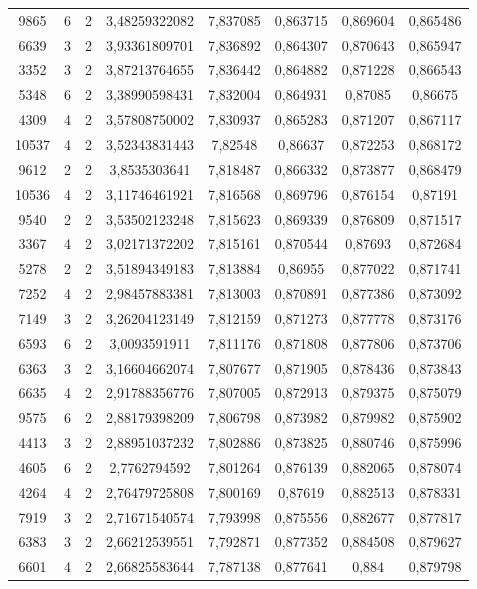 \begin{longtable}{|c|c|c|c|c|c|c|c|}
9865 & 6 & 2 & 3,48259322082 & 7,837085 & 0,863715 & 0,869604 & 0,865486 \\
6639 & 3 & 2 & 3,93361809701 & 7,836892 & 0,864307 & 0,870643 & 0,865947 \\
3352 & 3 & 2 & 3,87213764655 & 7,836442 & 0,864882 & 0,871228 & 0,866543 \\
5348 & 6 & 2 & 3,38990598431 & 7,832004 & 0,864931 & 0,87085 & 0,86675 \\
4309 & 4 & 2 & 3,57808750002 & 7,830937 & 0,865283 & 0,871207 & 0,867117 \\
10537 & 4 & 2 & 3,52343831443 & 7,82548 & 0,86637 & 0,872253 & 0,868172 \\
9612 & 2 & 2 & 3,8535303641 & 7,818487 & 0,866332 & 0,873877 & 0,868479 \\
10536 & 4 & 2 & 3,11746461921 & 7,816568 & 0,869796 & 0,876154 & 0,87191 \\
9540 & 2 & 2 & 3,53502123248 & 7,815623 & 0,869339 & 0,876809 & 0,871517 \\
3367 & 4 & 2 & 3,02171372202 & 7,815161 & 0,870544 & 0,87693 & 0,872684 \\
5278 & 2 & 2 & 3,51894349183 & 7,813884 & 0,86955 & 0,877022 & 0,871741 \\
7252 & 4 & 2 & 2,98457883381 & 7,813003 & 0,870891 & 0,877386 & 0,873092 \\
7149 & 3 & 2 & 3,26204123149 & 7,812159 & 0,871273 & 0,877778 & 0,873176 \\
6593 & 6 & 2 & 3,0093591911 & 7,811176 & 0,871808 & 0,877806 & 0,873706 \\
6363 & 3 & 2 & 3,16604662074 & 7,807677 & 0,871905 & 0,878436 & 0,873843 \\
6635 & 4 & 2 & 2,91788356776 & 7,807005 & 0,872913 & 0,879375 & 0,875079 \\
9575 & 6 & 2 & 2,88179398209 & 7,806798 & 0,873982 & 0,879982 & 0,875902 \\
4413 & 3 & 2 & 2,88951037232 & 7,802886 & 0,873825 & 0,880746 & 0,875996 \\
4605 & 6 & 2 & 2,7762794592 & 7,801264 & 0,876139 & 0,882065 & 0,878074 \\
4264 & 4 & 2 & 2,76479725808 & 7,800169 & 0,87619 & 0,882513 & 0,878331 \\
7919 & 3 & 2 & 2,71671540574 & 7,793998 & 0,875556 & 0,882677 & 0,877817 \\
6383 & 3 & 2 & 2,66212539551 & 7,792871 & 0,877352 & 0,884508 & 0,879627 \\
6601 & 4 & 2 & 2,66825583644 & 7,787138 & 0,877641 & 0,884 & 0,879798 \\

\end{longtable}
